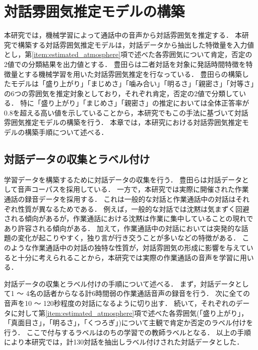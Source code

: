 \chapter{対話雰囲気推定モデルの構築\label{sec:develop_estimation_model}}
\thispagestyle{plain}

本研究では，機械学習によって通話中の音声から対話雰囲気を推定する．
本研究で構築する対話雰囲気推定モデルは，対話データから抽出した特徴量を入力値とし，第\ref{item:estimated_atmosphere}項で述べた各雰囲気について肯定，否定の2値での分類結果を出力値とする．
豊田らは二者対話を対象に発話時間特徴を特徴量とする機械学習を用いた対話雰囲気推定を行なっている\cite{Toyota}．
豊田らの構築したモデルは「盛り上がり」「まじめさ」「噛み合い」「明るさ」「親密さ」「対等さ」の6つの雰囲気を推定対象としており，それぞれ肯定，否定の2値で分類している．
特に「盛り上がり」「まじめさ」「親密さ」の推定においては全体正答率が0.8を超える高い値を示していることから，本研究でもこの手法に基づいて対話雰囲気推定モデルの構築を行う．
本章では，本研究における対話雰囲気推定モデルの構築手順について述べる．

\section{対話データの収集とラベル付け\label{node:deta_collection}}

学習データを構築するために対話データの収集を行う．
豊田らは対話データとして音声コーパス\cite{PASD}を採用している．
一方で，本研究では実際に開催された作業通話の録音データを採用する．
これは一般的な対話と作業通話中の対話はそれぞれ性質が異なるためである．
例えば，一般的な対話では沈黙は気まずく回避される傾向があるが，作業通話における沈黙は作業に集中していることの現れであり許容される傾向がある．
加えて，作業通話中の対話においては突発的な話題の変化が起こりやすく，独り言が行き交うことが多いなどの特徴がある．
このような作業通話中の対話の独特な性質が，対話雰囲気の形成に影響を与えていると十分に考えられることから，本研究では実際の作業通話の音声を学習に用いる．

対話データの収集とラベル付けの手順について述べる．
まず，対話データとして1 〜 4名の話者からなる計6時間弱の作業通話音声の録音を行う．
次に全ての音声を10 〜 120秒程度の対話になるように切り出す．
続いて，それぞれのデータに対して第\ref{item:estimated_atmosphere}項で述べた各雰囲気(「盛り上がり」，「真面目さ」，「明るさ」，「くつろぎ」)について主観で肯定か否定のラベル付けを行う．
ここで付与するラベルはのちの学習での教師ラベルとなる．
以上の手順により本研究では，計130対話を抽出しラベル付けされた対話データとした．

